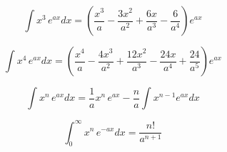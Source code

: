 \documentclass[%
aip,%
jcp,%
amsmath,amssymb,%
reprint,%
]{revtex4-1}
\begin{document}
\begin{equation*}
    \int x^3\,e^{ax} dx = \left(\frac{x^3}{a} - \frac{3x^2}{a^2} + \frac{6x}{a^3} -
    \frac{6}{a^4} \right) e^{ax}
\end{equation*}

\begin{equation*}
    \int x^4\,e^{ax} dx = \left( \frac{x^4}{a} - \frac{4x^3}{a^2} + \frac{12x^2}{a^3} 
    - \frac{24x}{a^4} + \frac{24}{a^5} \right) e^{ax}
\end{equation*}

\begin{equation*}
    \int x^n \, e^{ax} dx = \frac{1}{a} x^n \, e^{ax} - 
        \frac{n}{a} \int x^{n-1} e^{ax} dx
\end{equation*}

\begin{equation*}
    \int_0^{\infty} x^n \, e^{-ax} dx = \frac{n!}{a^{n+1}}
\end{equation*}
\end{document}
